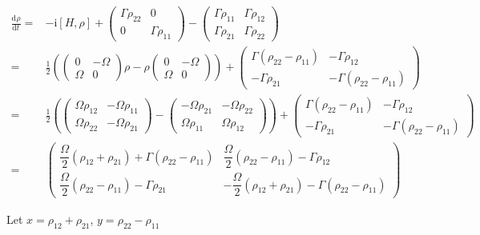 \documentclass[10pt,fleqn]{article}
\newcommand{\ud}{\mathrm{d}}
\newcommand{\ui}{\mathrm{i}}
\newcommand{\eqar}[1]
{
  \begin{align*}
    #1
  \end{align*}
}
\newcommand{\paren}[1]{{\left({#1}\right)}}
\newcommand{\sqr}[1]{{\left[{#1}\right]}}
\newcommand{\diff}[3][{}]{{\frac{\ud^{#1} {#2}}{\ud {#3}{}^{#1}}}}
\begin{document}
\eqar{
  \diff{\rho}{t}=&-\ui\sqr{H, \rho}+\begin{pmatrix}
    \Gamma\rho_{22}&0\\
    0&\Gamma\rho_{11}
  \end{pmatrix}-\begin{pmatrix}
    \Gamma\rho_{11}&\Gamma\rho_{12}\\
    \Gamma\rho_{21}&\Gamma\rho_{22}
  \end{pmatrix}\\
  =&\frac12\paren{\begin{pmatrix}
      0&-\Omega\\
      \Omega&0
    \end{pmatrix}\rho-\rho\begin{pmatrix}
      0&-\Omega\\
      \Omega&0
    \end{pmatrix}}+\begin{pmatrix}
    \Gamma\paren{\rho_{22}-\rho_{11}}&-\Gamma\rho_{12}\\
    -\Gamma\rho_{21}&-\Gamma\paren{\rho_{22}-\rho_{11}}
  \end{pmatrix}\\
  =&\frac12\paren{\begin{pmatrix}
      \Omega\rho_{12}&-\Omega\rho_{11}\\
      \Omega\rho_{22}&-\Omega\rho_{21}
    \end{pmatrix}-\begin{pmatrix}
      -\Omega\rho_{21}&-\Omega\rho_{22}\\
      \Omega\rho_{11}&\Omega\rho_{12}
    \end{pmatrix}}+\begin{pmatrix}
    \Gamma\paren{\rho_{22}-\rho_{11}}&-\Gamma\rho_{12}\\
    -\Gamma\rho_{21}&-\Gamma\paren{\rho_{22}-\rho_{11}}
  \end{pmatrix}\\
  =&\begin{pmatrix}
    \dfrac\Omega2\paren{\rho_{12}+\rho_{21}}+\Gamma\paren{\rho_{22}-\rho_{11}}&\dfrac\Omega2\paren{\rho_{22}-\rho_{11}}-\Gamma\rho_{12}\\
    \dfrac\Omega2\paren{\rho_{22}-\rho_{11}}-\Gamma\rho_{21}&-\dfrac\Omega2\paren{\rho_{12}+\rho_{21}}-\Gamma\paren{\rho_{22}-\rho_{11}}
  \end{pmatrix}
}
Let $x=\rho_{12}+\rho_{21}$, $y=\rho_{22}-\rho_{11}$
\end{document}
